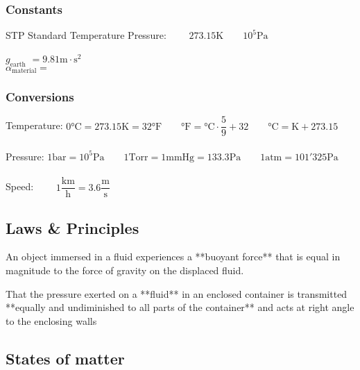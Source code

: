 \subsubsection{Constants}

STP Standard Temperature Pressure: $\qquad 273.15\text{K} \qquad 10^5\text{Pa}$ 

$g_\text{earth}$ $= 9.81 \text{m}\cdot\text{s}^\text{2}$ \\
$\alpha_\text{material} = $

\subsubsection{Conversions}

Temperature: \qquad $0\text{°C} = 273.15\text{K}=32\text{°F} \qquad \text{°F} = \text{°C} \cdot \dfrac{5}{9} + 32 \qquad \text{°C} = \text{K} + 273.15$
\\\\
Pressure: \qquad
  $1\text{bar} = 10^5\text{Pa} \qquad 
   1\text{Torr} = 1\text{mmHg} = 133.3\text{Pa} \qquad
   1\text{atm} = 101'325\text{Pa}$
\\\\
Speed: $\qquad 1\dfrac{\text{km}}{\text{h}}     = 3.6\dfrac{\text{m}}{\text{s}}$

\subsection{Laws \& Principles}

An object immersed in a fluid experiences a **buoyant force** that is equal in magnitude to the force of gravity on the displaced fluid.

That the pressure exerted on a **fluid** in an enclosed container is transmitted **equally and undiminished to all parts of the container** and acts at right angle to the enclosing walls


\subsection{States of matter}